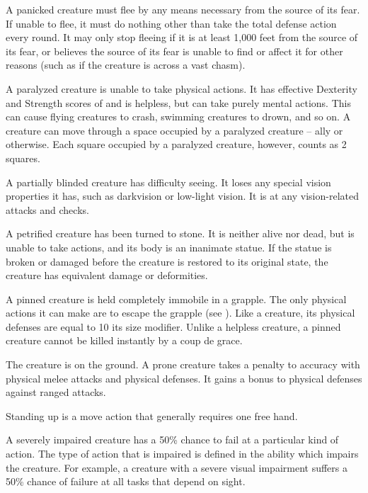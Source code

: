  A panicked creature must flee by any means necessary from the source of its fear. If unable to flee, it must do nothing other than take the total defense action every round. It may only stop fleeing if it is at least 1,000 feet from the source of its fear, or believes the source of its fear is unable to find or affect it for other reasons (such as if the creature is across a vast chasm).

 A paralyzed creature is unable to take physical actions. It has effective Dexterity and Strength scores of  and is helpless, but can take purely mental actions. This can cause flying creatures to crash, swimming creatures to drown, and so on. A creature can move through a space occupied by a paralyzed creature -- ally or otherwise. Each square occupied by a paralyzed creature, however, counts as 2 squares.

 A partially blinded creature has difficulty seeing. It loses any special vision properties it has, such as darkvision or low-light vision. It is \impaired at any vision-related attacks and checks.

 A petrified creature has been turned to stone. It is neither alive nor dead, but is unable to take actions, and its body is an inanimate statue. If the statue is broken or damaged before the creature is restored to its original state, the creature has equivalent damage or deformities.

 A pinned creature is held completely immobile in a grapple.
The only physical actions it can make are to escape the grapple (see ).
Like a  creature, its physical defenses are equal to 10 \add its size modifier.
Unlike a helpless creature, a pinned creature cannot be killed instantly by a coup de grace.

 The creature is on the ground. A prone creature takes a  penalty to accuracy with physical melee attacks and physical defenses. It gains a  bonus to physical defenses against ranged attacks.

Standing up is a move action that generally requires one free hand.

 A severely impaired creature has a 50\% chance to fail at a particular kind of action. The type of action that is impaired is defined in the ability which impairs the creature. For example, a creature with a severe visual impairment suffers a 50\% chance of failure at all tasks that depend on sight.

